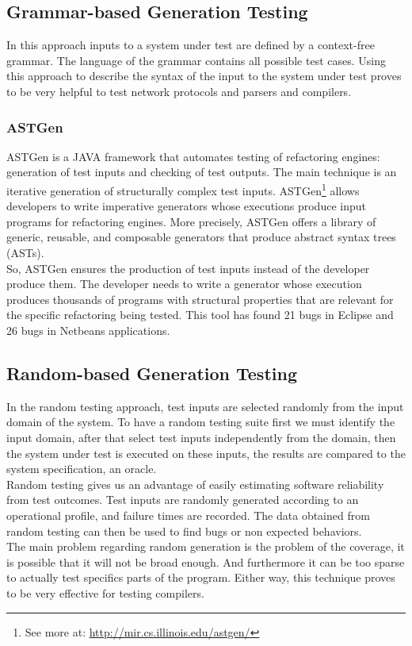 \documentclass[a4paper,UKenglish]{oasics}
\begin{document}
\subsection{Grammar-based Generation Testing}
In this approach inputs to a system under test are defined by a context-free grammar. The language of the grammar contains all possible test cases.
Using this approach to describe the syntax of the input to the system under test proves to be very helpful to test
network protocols\cite{tal:syntax-based,kaksonen2001functional} and parsers and compilers\cite{1994-burgess,Burgess_Saidi_1996}.

\subsubsection{ASTGen}
ASTGen\cite{Daniel:2007:ATR:1287624.1287651} is a JAVA framework that automates testing of refactoring engines: generation of test inputs
and checking of test outputs. The main technique is an iterative generation of structurally complex test inputs.
ASTGen\footnote{See more at: \url{http://mir.cs.illinois.edu/astgen/}} allows developers to write imperative generators whose executions
produce input programs for refactoring engines. More precisely, ASTGen
offers a library of generic, reusable, and composable generators that produce abstract syntax trees (ASTs).\\
So, ASTGen ensures the production of test inputs instead of the developer produce them. The developer needs to write a generator whose execution
produces thousands of programs with structural properties that are relevant for the specific refactoring being tested. This tool has found
21 bugs in Eclipse and 26 bugs in Netbeans applications.

\subsection{Random-based Generation Testing}
In the random testing approach, test inputs are selected randomly from the input domain of the system.
To have a random testing suite first we must identify the input domain, after that select test inputs independently from the domain,
then the system under test is executed on these inputs, the results are compared to the system specification, an oracle.\\
Random testing gives us an advantage of easily estimating software reliability from test outcomes.
Test inputs are randomly generated according to an operational profile, and failure times are recorded.
The data obtained from random testing can then be used to find bugs or non expected behaviors.\\
\indent The main problem regarding random generation is the problem of the coverage, it is possible that it will not be broad enough. And furthermore it can be
too sparse to actually test specifics parts of the program. Either way, this technique proves to be very effective for testing compilers.
\end{document}
